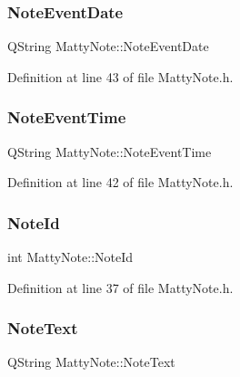 \subsubsection{\texorpdfstring{Note\+Event\+Date}{NoteEventDate}}
{\footnotesize\ttfamily Q\+String Matty\+Note\+::\+Note\+Event\+Date\hspace{0.3cm}{\ttfamily [private]}}



Definition at line 43 of file Matty\+Note.\+h.

\hypertarget{classMattyNote_a3e69ae7fb7c8c616594a9647c14a192e}{}\label{classMattyNote_a3e69ae7fb7c8c616594a9647c14a192e} 
\subsubsection{\texorpdfstring{Note\+Event\+Time}{NoteEventTime}}
{\footnotesize\ttfamily Q\+String Matty\+Note\+::\+Note\+Event\+Time\hspace{0.3cm}{\ttfamily [private]}}



Definition at line 42 of file Matty\+Note.\+h.

\hypertarget{classMattyNote_a15a3c21ef00e8c629aeb58025121b0a9}{}\label{classMattyNote_a15a3c21ef00e8c629aeb58025121b0a9} 
\subsubsection{\texorpdfstring{Note\+Id}{NoteId}}
{\footnotesize\ttfamily int Matty\+Note\+::\+Note\+Id\hspace{0.3cm}{\ttfamily [private]}}



Definition at line 37 of file Matty\+Note.\+h.

\hypertarget{classMattyNote_ab54fa825ed3ce8081befdb0c391d682b}{}\label{classMattyNote_ab54fa825ed3ce8081befdb0c391d682b} 
\subsubsection{\texorpdfstring{Note\+Text}{NoteText}}
{\footnotesize\ttfamily Q\+String Matty\+Note\+::\+Note\+Text\hspace{0.3cm}{\ttfamily [private]}}




